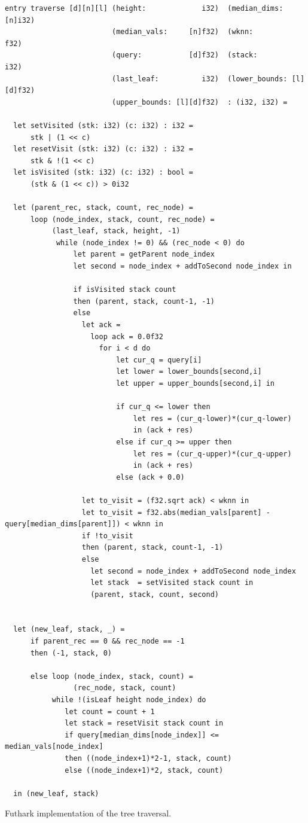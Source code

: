 \begin{listing}[H]
\begin{verbatim}
entry traverse [d][n][l] (height:             i32)  (median_dims:     [n]i32)
                         (median_vals:     [n]f32)  (wknn:               f32)
                         (query:           [d]f32)  (stack:              i32) 
                         (last_leaf:          i32)  (lower_bounds: [l][d]f32)
                         (upper_bounds: [l][d]f32)  : (i32, i32) =

  let setVisited (stk: i32) (c: i32) : i32 =
      stk | (1 << c)
  let resetVisit (stk: i32) (c: i32) : i32 =
      stk & !(1 << c)
  let isVisited (stk: i32) (c: i32) : bool =
      (stk & (1 << c)) > 0i32

  let (parent_rec, stack, count, rec_node) =
      loop (node_index, stack, count, rec_node) =
           (last_leaf, stack, height, -1)
            while (node_index != 0) && (rec_node < 0) do
                let parent = getParent node_index
                let second = node_index + addToSecond node_index in

                if isVisited stack count
                then (parent, stack, count-1, -1)
                else
                  let ack = 
                    loop ack = 0.0f32
                      for i < d do
                          let cur_q = query[i]
                          let lower = lower_bounds[second,i]
                          let upper = upper_bounds[second,i] in

                          if cur_q <= lower then
                              let res = (cur_q-lower)*(cur_q-lower)
                              in (ack + res)
                          else if cur_q >= upper then
                              let res = (cur_q-upper)*(cur_q-upper)
                              in (ack + res)
                          else (ack + 0.0)

                  let to_visit = (f32.sqrt ack) < wknn in
                  let to_visit = f32.abs(median_vals[parent] - query[median_dims[parent]]) < wknn in
                  if !to_visit
                  then (parent, stack, count-1, -1)
                  else
                    let second = node_index + addToSecond node_index
                    let stack  = setVisited stack count in
                    (parent, stack, count, second)


  let (new_leaf, stack, _) =
      if parent_rec == 0 && rec_node == -1
      then (-1, stack, 0)

      else loop (node_index, stack, count) =
                (rec_node, stack, count)
           while !(isLeaf height node_index) do
              let count = count + 1
              let stack = resetVisit stack count in
              if query[median_dims[node_index]] <= median_vals[node_index]
              then ((node_index+1)*2-1, stack, count)
              else ((node_index+1)*2, stack, count)

  in (new_leaf, stack)
\end{verbatim}
\caption{Futhark implementation of the tree traversal.}
\label{lst:traverse}
\end{listing}






